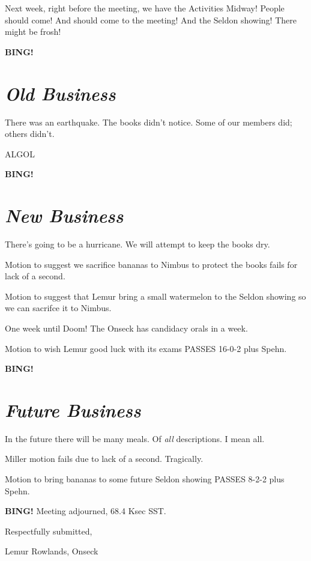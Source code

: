 \documentclass[10pt]{article}
\newcommand{\bing}{{\bf BING!} }
\newcommand{\goto}[1]{\bing \vskip 12pt \section*{{\em{#1}}}}
\newcommand{\ps}{ plus Spehn\xspace}
\newcommand{\onseck}{Lemur Rowlands, Onseck}
\begin{document}
Next week, right before the meeting, we have the Activities Midway!  People should come!
And should come to the meeting!  And the Seldon showing!  There might be frosh!


\goto{Old Business}

There was an earthquake.  The books didn't notice.  Some of our members did;
others didn't.

ALGOL

\goto{New Business}

There's going to be a hurricane.  We will attempt to keep the books dry.

Motion to suggest we sacrifice bananas to Nimbus to protect the books
fails for lack of a second.

Motion to suggest that Lemur bring a small watermelon to the Seldon showing
so we can sacrifce it to Nimbus.

One week until Doom!  The Onseck has candidacy orals in a week.

Motion to wish Lemur good luck with its exams PASSES 16-0-2\ps.

\goto{Future Business}

In the future there will be many meals.  Of \emph{all} descriptions.
I mean all.

Miller motion fails due to lack of a second.  Tragically.

Motion to bring bananas to some future Seldon showing PASSES 8-2-2\ps.

\bing
\noindent
Meeting adjourned, 68.4 Ksec SST.

\vspace{18pt}

\centerline{Respectfully submitted,}
\centerline{\onseck}
\end{document}
